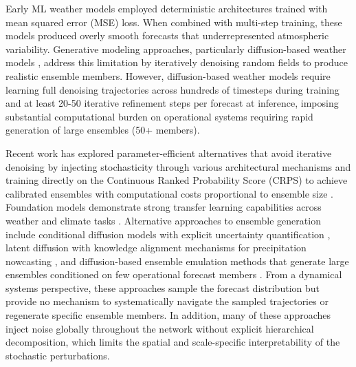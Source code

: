 \documentclass{agujournal2019}
\begin{document}
Early ML weather models employed deterministic architectures trained with mean squared error (MSE) loss. When combined with multi-step training, these models produced overly smooth forecasts that underrepresented atmospheric variability. Generative modeling approaches, particularly diffusion-based weather models \cite{sohl-dickstein2015deep, ho2020denoising, song2021scorebased, price2025gencast}, address this limitation by iteratively denoising random fields to produce realistic ensemble members. However, diffusion-based weather models \cite{price2025gencast} require learning full denoising trajectories across hundreds of timesteps during training and at least 20-50 iterative refinement steps per forecast at inference, imposing substantial computational burden on operational systems requiring rapid generation of large ensembles (50+ members).

Recent work has explored parameter-efficient alternatives that avoid iterative denoising by injecting stochasticity through various architectural mechanisms and training directly on the Continuous Ranked Probability Score (CRPS) to achieve calibrated ensembles with computational costs proportional to ensemble size \cite{lang2024aifs, alet2024fgn, bonev2025fourcastnet3, fuxi_ens, kochkov2024neuralgcm}. Foundation models demonstrate strong transfer learning capabilities across weather and climate tasks \cite{nguyen2023climax, bodnar2025aurora, allen2025aardvark}. Alternative approaches to ensemble generation include conditional diffusion models with explicit uncertainty quantification \cite{shi2025codicast}, latent diffusion with knowledge alignment mechanisms for precipitation nowcasting \cite{gao2023prediff}, and diffusion-based ensemble emulation methods that generate large ensembles conditioned on few operational forecast members \cite{price2024seeds}. From a dynamical systems perspective, these approaches sample the forecast distribution but provide no mechanism to systematically navigate the sampled trajectories or regenerate specific ensemble members. In addition, many of these approaches inject noise globally throughout the network without explicit hierarchical decomposition, which limits the spatial and scale-specific interpretability of the stochastic perturbations.  
\end{document}
